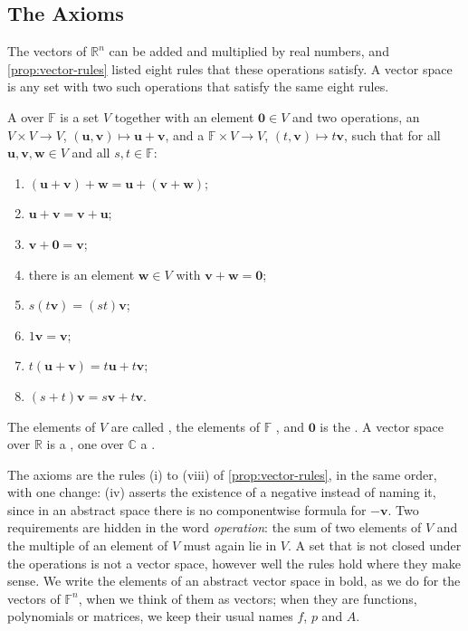 \subsection{The Axioms}

The vectors of $\mathbb R^n$ can be added and multiplied by real numbers, and \cref{prop:vector-rules} listed eight rules that these operations satisfy. A vector space is any set with two such operations that satisfy the same eight rules.

\begin{definition}
\label{def:vector-space}
A  over $\mathbb F$ is a set $V$ together with an element $\mathbf 0\in V$ and two operations, an  $V\times V\to V$, $(\mathbf u,\mathbf v)\mapsto\mathbf u+\mathbf v$, and a  $\mathbb F\times V\to V$, $(t,\mathbf v)\mapsto t\mathbf v$, such that for all $\mathbf u,\mathbf v,\mathbf w\in V$ and all $s,t\in\mathbb F$:
\begin{enumerate}
\item $(\mathbf u+\mathbf v)+\mathbf w=\mathbf u+(\mathbf v+\mathbf w)$;
\item $\mathbf u+\mathbf v=\mathbf v+\mathbf u$;
\item $\mathbf v+\mathbf 0=\mathbf v$;
\item there is an element $\mathbf w\in V$ with $\mathbf v+\mathbf w=\mathbf 0$;
\item $s(t\mathbf v)=(st)\mathbf v$;
\item $1\mathbf v=\mathbf v$;
\item $t(\mathbf u+\mathbf v)=t\mathbf u+t\mathbf v$;
\item $(s+t)\mathbf v=s\mathbf v+t\mathbf v$.
\end{enumerate}
The elements of $V$ are called , the elements of $\mathbb F$ , and $\mathbf 0$ is the . A vector space over $\mathbb R$ is a , one over $\mathbb C$ a .
\end{definition}

The axioms are the rules (i) to (viii) of \cref{prop:vector-rules}, in the same order, with one change: (iv) asserts the existence of a negative instead of naming it, since in an abstract space there is no componentwise formula for $-\mathbf v$. Two requirements are hidden in the word \emph{operation}: the sum of two elements of $V$ and the multiple of an element of $V$ must again lie in $V$. A set that is not closed under the operations is not a vector space, however well the rules hold where they make sense. We write the elements of an abstract vector space in bold, as we do for the vectors of $\mathbb F^n$, when we think of them as vectors; when they are functions, polynomials or matrices, we keep their usual names $f$, $p$ and $A$.

